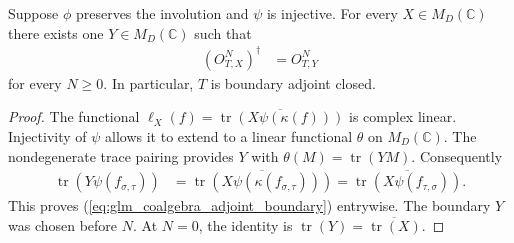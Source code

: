 \begin{lemma}
    \label{thm:glm_coalgebra_adjoint_boundary}
    \leanok
    Suppose $\phi$ preserves the involution and $\psi$ is injective.
    For every $X\in M_D(\mathbb C)$ there exists one
    $Y\in M_D(\mathbb C)$ such that
    \begin{align}
        (O^N_{T,X})^\dagger & =O^N_{T,Y}
        \label{eq:glm_coalgebra_adjoint_boundary}
    \end{align}
    for every $N\geq0$. In particular, $T$ is boundary adjoint closed.
\end{lemma}
\begin{proof}
    \leanok
    The functional
    $\ell_X(f)=\overline{\operatorname{tr}(X\psi(\kappa(f)))}$
    is complex linear. Injectivity of $\psi$ allows it to extend to a
    linear functional $\theta$ on $M_D(\mathbb C)$. The nondegenerate
    trace pairing provides $Y$ with $\theta(M)=\operatorname{tr}(YM)$.
    Consequently
    \begin{align*}
        \operatorname{tr}(Y\psi(f_{\sigma,\tau}))
         & =\overline{\operatorname{tr}
        (X\psi(\kappa(f_{\sigma,\tau})))}
        =\overline{\operatorname{tr}(X\psi(f_{\tau,\sigma}))}.
    \end{align*}
    This proves (\ref{eq:glm_coalgebra_adjoint_boundary}) entrywise.
    The boundary $Y$ was chosen before $N$. At $N=0$, the identity is
    $\operatorname{tr}(Y)=\overline{\operatorname{tr}(X)}$.
\end{proof}

